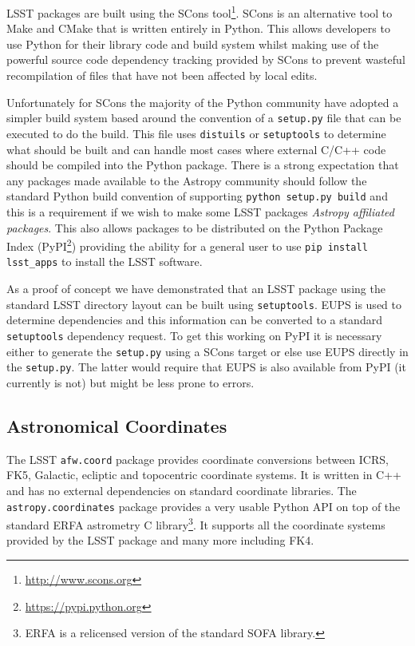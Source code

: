 \documentclass[]{spie}  %
\begin{document}
LSST packages are built using the SCons tool\footnote{\url{http://www.scons.org}}\cite{2005Scons1377085}.
SCons is an alternative tool to Make and CMake that is written entirely in Python.
This allows developers to use Python for their library code and build system whilst making use of the powerful source code dependency tracking provided by SCons to prevent wasteful recompilation of files that have not been affected by local edits.

Unfortunately for SCons the majority of the Python community have adopted a simpler build system based around the convention of a \texttt{setup.py} file that can be executed to do the build.
This file uses \texttt{distuils} or \texttt{setuptools} to determine what should be built and can handle most cases where external C/C++ code should be compiled into the Python package.
There is a strong expectation that any packages made available to the Astropy community should follow the standard Python build convention of supporting \texttt{python setup.py build} and this is a requirement if we wish to make some LSST packages \emph{Astropy affiliated packages}.
This also allows packages to be distributed on the Python Package Index (PyPI\footnote{\url{https://pypi.python.org}}) providing the ability for a general user to use \texttt{pip install lsst\_apps} to install the LSST software.

As a proof of concept we have demonstrated that an LSST package using the standard LSST directory layout can be built using \texttt{setuptools}.
EUPS is used to determine dependencies and this information can be converted to a standard \texttt{setuptools} dependency request.
To get this working on PyPI it is necessary either to generate the \texttt{setup.py} using a SCons target or else use EUPS directly in the \texttt{setup.py}.
The latter would require that EUPS is also available from PyPI (it currently is not) but might be less prone to errors.

\subsection{Astronomical Coordinates}

The LSST \texttt{afw.coord} package provides coordinate conversions between ICRS, FK5, Galactic, ecliptic and topocentric coordinate systems.
It is written in C++ and has no external dependencies on standard coordinate libraries.
The \texttt{astropy.coordinates} package provides a very usable Python API on top of the standard ERFA astrometry C library\footnote{ERFA is a relicensed version of the standard SOFA library\cite{2011SchpJ...611404H}.}.
It supports all the coordinate systems provided by the LSST package and many more including FK4.
\end{document}
